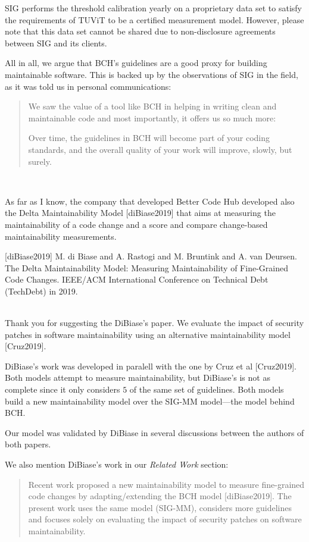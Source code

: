 \documentclass[11pt,fleqn]{article}
\newcommand{\eline}{\vspace*{.75\baselineskip}}
\newcommand{\Referee}[1]{\eline \noindent {\bf Reviewer comment #1:} \\}
\newcommand{\Us}{\eline \noindent {\bf Response:}\\}
\newenvironment{revcomment}[1][]
{\Referee{#1}\begin{rcomment}}
{\end{rcomment}}
\begin{document}
SIG performs the threshold calibration
yearly on a proprietary data set to satisfy the requirements of TUViT to
be a certified measurement model. However, please note that this data set 
cannot be shared due to non-disclosure agreements between SIG and its 
clients.

All in all, we argue that BCH's guidelines are a good proxy for building maintainable software. This is 
backed up by the observations of SIG in the field, as it was told us in personal communications: 

\begin{quote}
We saw the value of a tool like BCH in helping in writing clean and maintainable code and most importantly, 
it offers us so much more:

Over time, the guidelines in BCH will become part of your coding standards, and the overall quality of your 
work will improve, slowly, but surely.
\end{quote}

\begin{revcomment}[1.2]

    As far as I know, the company that developed Better Code Hub 
    developed also the Delta Maintainability Model [diBiase2019] 
    that aims at measuring the maintainability of a code change 
    and a score and compare change-based maintainability measurements.

    [diBiase2019] M. di Biase and A. Rastogi and M. Bruntink and A. van 
    Deursen. The Delta Maintainability Model: Measuring Maintainability 
    of Fine-Grained Code Changes. IEEE/ACM International Conference 
    on Technical Debt (TechDebt) in 2019.

\end{revcomment}

\Us Thank you for suggesting the DiBiase's paper. 
We evaluate the impact of security patches in software 
maintainability using an alternative maintainability model [Cruz2019]. 

DiBiase's work was developed in paralell with the one by Cruz et al [Cruz2019]. 
Both models attempt to measure maintainability, but DiBiase's is not as complete 
since it only considers $5$ of the same set of guidelines. Both models build a 
new maintainability model over the SIG-MM model---the model behind BCH. 

Our model was validated by DiBiase in several discussions between 
the authors of both papers.

We also mention DiBiase's work in our \textit{Related Work} section:
\begin{quote}
    Recent work
proposed a new maintainability model to 
measure fine-grained code changes by adapting/extending the BCH model [diBiase2019].
The present work uses the same model (SIG-MM), considers more guidelines and focuses 
solely on evaluating the impact of security patches on software maintainability.
\end{quote}
\end{document}
